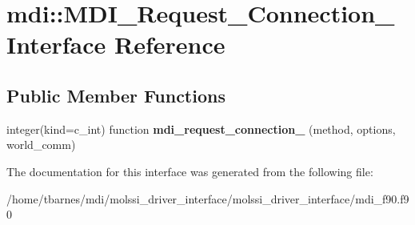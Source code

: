 \hypertarget{interfacemdi_1_1MDI__Request__Connection__}{\section{mdi\-:\-:M\-D\-I\-\_\-\-Request\-\_\-\-Connection\-\_\- Interface Reference}
\label{interfacemdi_1_1MDI__Request__Connection__}
}
\subsection*{Public Member Functions}
\begin{DoxyCompactItemize}
\item 
\hypertarget{interfacemdi_1_1MDI__Request__Connection___a8682647b24b64d9d3f15cd0f1908e380}{integer(kind=c\-\_\-int) function {\bfseries mdi\-\_\-request\-\_\-connection\-\_\-} (method, options, world\-\_\-comm)}\label{interfacemdi_1_1MDI__Request__Connection___a8682647b24b64d9d3f15cd0f1908e380}

\end{DoxyCompactItemize}


The documentation for this interface was generated from the following file\-:\begin{DoxyCompactItemize}
\item 
/home/tbarnes/mdi/molssi\-\_\-driver\-\_\-interface/molssi\-\_\-driver\-\_\-interface/mdi\-\_\-f90.\-f90\end{DoxyCompactItemize}
